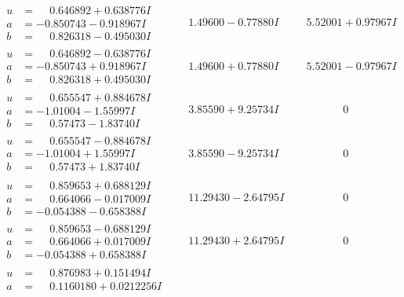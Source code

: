 \documentclass[1p]{elsarticle_modified}
\theoremstyle{definition}
\begin{document}
$$\begin{array}{c|c|c}
\begin{aligned}
u &= \phantom{-}0.646892 + 0.638776 I \\
a &= -0.850743 - 0.918967 I \\
b &= \phantom{-}0.826318 - 0.495030 I\end{aligned}
 & \phantom{-}1.49600 - 0.77880 I & \phantom{-}5.52001 + 0.97967 I \\ \hline\begin{aligned}
u &= \phantom{-}0.646892 - 0.638776 I \\
a &= -0.850743 + 0.918967 I \\
b &= \phantom{-}0.826318 + 0.495030 I\end{aligned}
 & \phantom{-}1.49600 + 0.77880 I & \phantom{-}5.52001 - 0.97967 I \\ \hline\begin{aligned}
u &= \phantom{-}0.655547 + 0.884678 I \\
a &= -1.01004 - 1.55997 I \\
b &= \phantom{-}0.57473 - 1.83740 I\end{aligned}
 & \phantom{-}3.85590 + 9.25734 I & \phantom{-0.000000 } 0 \\ \hline\begin{aligned}
u &= \phantom{-}0.655547 - 0.884678 I \\
a &= -1.01004 + 1.55997 I \\
b &= \phantom{-}0.57473 + 1.83740 I\end{aligned}
 & \phantom{-}3.85590 - 9.25734 I & \phantom{-0.000000 } 0 \\ \hline\begin{aligned}
u &= \phantom{-}0.859653 + 0.688129 I \\
a &= \phantom{-}0.664066 - 0.017009 I \\
b &= -0.054388 - 0.658388 I\end{aligned}
 & \phantom{-}11.29430 - 2.64795 I & \phantom{-0.000000 } 0 \\ \hline\begin{aligned}
u &= \phantom{-}0.859653 - 0.688129 I \\
a &= \phantom{-}0.664066 + 0.017009 I \\
b &= -0.054388 + 0.658388 I\end{aligned}
 & \phantom{-}11.29430 + 2.64795 I & \phantom{-0.000000 } 0 \\ \hline\begin{aligned}
u &= \phantom{-}0.876983 + 0.151494 I \\
a &= \phantom{-}0.1160180 + 0.0212256 I \\

\end{aligned}
\end{array}$$
\end{document}

